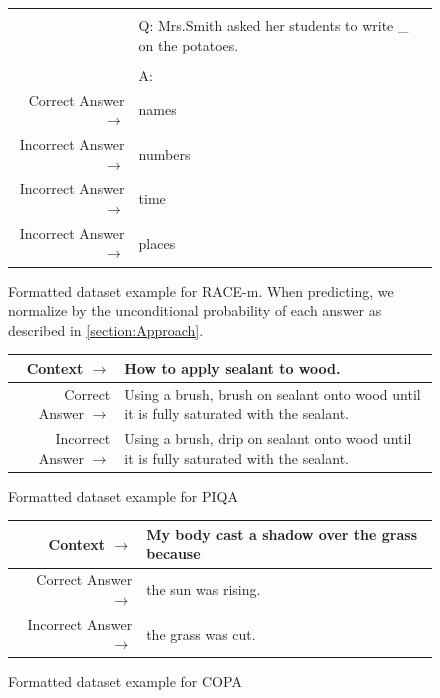 \begin{figure}
{\begin{tabularx}{\linewidth}{r X}
 &  \\ 
 & Q: Mrs.Smith asked her students to write    \_  on the potatoes. \\ 
 &  \\ 
 & A: \\ 
 \midrule Correct Answer $\to$ & names \\ 
 Incorrect Answer $\to$ & numbers \\ 
 Incorrect Answer $\to$ & time \\ 
 Incorrect Answer $\to$ & places\\ \bottomrule \end{tabularx} }  \caption{Formatted dataset example for RACE-m. When predicting, we normalize by the unconditional probability of each answer as described in \ref{section:Approach}.}  \label{eval:RACE-m}  \end{figure}%
\begin{figure} { \tt \footnotesize \begin{tabularx}{\linewidth}{r X} \toprule Context $\to$ & How to apply sealant to wood. \\ 
 \midrule Correct Answer $\to$ & Using a brush, brush on sealant onto wood until it is fully saturated with the sealant. \\ 
 Incorrect Answer $\to$ & Using a brush, drip on sealant onto wood until it is fully saturated with the sealant.\\ \bottomrule \end{tabularx} }  \caption{Formatted dataset example for PIQA}  \label{eval:PIQA}  \end{figure}%
\begin{figure} { \tt \footnotesize \begin{tabularx}{\linewidth}{r X} \toprule Context $\to$ & My body cast a shadow over the grass because \\ 
 \midrule Correct Answer $\to$ & the sun was rising. \\ 
 Incorrect Answer $\to$ & the grass was cut.\\ \bottomrule \end{tabularx} }  \caption{Formatted dataset example for COPA}  \label{eval:COPA}  \end{figure}%
